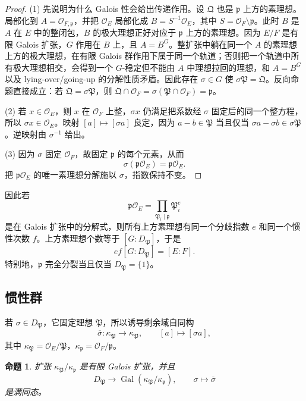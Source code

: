 \documentclass[11pt,a4paper,openany]{ctexbook}
\numberwithin{equation}{chapter}
\newcommand{\OF}{\mathcal{O}_F}
\newcommand{\Gal}{\operatorname{Gal}}
\theoremstyle{plain}
\newtheorem{proposition}[theorem]{命题}
\theoremstyle{definition}
\theoremstyle{remark}
\begin{document}
\begin{proof}
(1) 先说明为什么 Galois 性会给出传递作用。设 $\mathfrak Q$ 也是 $\mathfrak p$ 上方的素理想。局部化到
$A=\mathcal O_{F,\mathfrak p}$，并把 $\mathcal O_E$ 局部化成
$B=S^{-1}\mathcal O_E$，其中 $S=\OF\setminus\mathfrak p$。此时 $B$ 是
$A$ 在 $E$ 中的整闭包，$B$ 的极大理想正好对应于 $\mathfrak p$ 上方的素理想。因为
$E/F$ 是有限 Galois 扩张，$G$ 作用在 $B$ 上，且 $A=B^G$。整扩张中躺在同一个
$A$ 的素理想上方的极大理想，在有限 Galois 群作用下属于同一个轨道；否则把一个轨道中所有极大理想相交，会得到一个 $G$-稳定但不能由 $A$ 中理想拉回的理想，和
$A=B^G$ 以及 lying-over/going-up 的分解性质矛盾。因此存在 $\sigma\in G$ 使
$\sigma\mathfrak P=\mathfrak Q$。反向命题直接成立：若
$\mathfrak Q=\sigma\mathfrak P$，则
$\mathfrak Q\cap\OF=\sigma(\mathfrak P\cap\OF)=\mathfrak p$。

(2) 若 $x\in\mathcal O_E$，则 $x$ 在 $\OF$ 上整，$\sigma x$ 仍满足把系数经 $\sigma$ 固定后的同一个整方程，所以 $\sigma x\in\mathcal O_E$。映射 $[a]\mapsto[\sigma a]$ 良定，因为 $a-b\in\mathfrak P$ 当且仅当 $\sigma a-\sigma b\in\sigma\mathfrak P$。逆映射由 $\sigma^{-1}$ 给出。

(3) 因为 $\sigma$ 固定 $\OF$，故固定 $\mathfrak p$ 的每个元素，从而
\[
\sigma(\mathfrak p\mathcal O_E)=\mathfrak p\mathcal O_E.
\]
把 $\mathfrak p\mathcal O_E$ 的唯一素理想分解施以 $\sigma$，指数保持不变。
\end{proof}

因此若
\[
\mathfrak p\mathcal O_E=\prod_{\mathfrak P_i\mid\mathfrak p}\mathfrak P_i^e
\]
是在 Galois 扩张中的分解式，则所有上方素理想有同一个分歧指数 $e$ 和同一个惯性次数 $f$。上方素理想个数等于 $[G:D_{\mathfrak P}]$，于是
\[
ef[G:D_{\mathfrak P}]=[E:F].
\]
特别地，$\mathfrak p$ 完全分裂当且仅当 $D_{\mathfrak P}=\{1\}$。

\subsection{惯性群}

若 $\sigma\in D_{\mathfrak P}$，它固定理想 $\mathfrak P$，所以诱导剩余域自同构
\[
\overline\sigma:\kappa_{\mathfrak P}\longrightarrow\kappa_{\mathfrak P},
\qquad
[a]\longmapsto[\sigma a],
\]
其中 $\kappa_{\mathfrak P}=\mathcal O_E/\mathfrak P$，$\kappa_{\mathfrak p}=\OF/\mathfrak p$。

\begin{proposition}
扩张 $\kappa_{\mathfrak P}/\kappa_{\mathfrak p}$ 是有限 Galois 扩张，并且
\[
D_{\mathfrak P}\longrightarrow\Gal(\kappa_{\mathfrak P}/\kappa_{\mathfrak p}),
\qquad
\sigma\longmapsto\overline\sigma
\]
是满同态。
\end{proposition}
\end{document}
